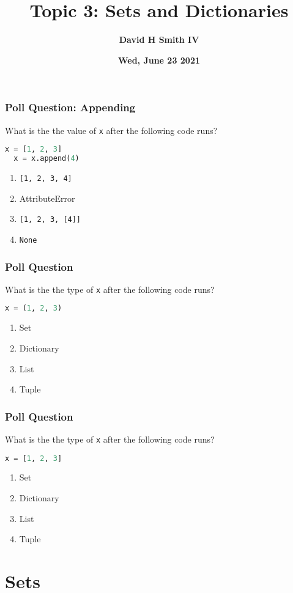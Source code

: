 \documentclass[xcolor=table]{beamer}
\title{\textbf{Topic 3: Sets and Dictionaries}}
\author{\textbf{David H Smith IV}}
\institute[\textbf{UIUC}]{\textbf{University of Illinois Urbana-Champaign}}
\date{\textbf{Wed, June 23 2021}}
\begin{document}
\frame{\titlepage}

%
%
\begin{frame}[fragile]
  \frametitle{Poll Question: Appending}
  What is the the value of \lstinline|x| after the following code runs?
  \begin{lstlisting}[language=Python, autogobble]
  x = [1, 2, 3]
  x = x.append(4)
  \end{lstlisting}
  \vfill
  \begin{enumerate}[A] 
    \item \lstinline|[1, 2, 3, 4]|
    \item AttributeError
    \item \lstinline|[1, 2, 3, [4]]|
    \item \lstinline|None|
  \end{enumerate}
\end{frame}

%
%
\begin{frame}[fragile]
  \frametitle{Poll Question}
  What is the the type of \lstinline|x| after the following code runs?
  \begin{lstlisting}[language=Python, autogobble]
  x = (1, 2, 3)
  \end{lstlisting}
  \vfill
  \begin{enumerate}[A] 
    \item Set
    \item Dictionary
    \item List
    \item Tuple
  \end{enumerate}
\end{frame}

%
%
\begin{frame}[fragile]
  \frametitle{Poll Question}
  What is the the type of \lstinline|x| after the following code runs?
  \begin{lstlisting}[language=Python, autogobble]
  x = [1, 2, 3]
  \end{lstlisting}
  \vfill
  \begin{enumerate}[A] 
    \item Set
    \item Dictionary
    \item List
    \item Tuple
  \end{enumerate}
\end{frame}

\section{Sets}
\end{document}
